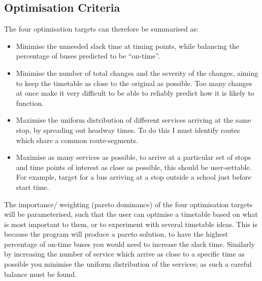 \documentclass{article}
\begin{document}
\subsection{Optimisation Criteria}
The four optimisation targets can therefore be summarised as:
\begin{itemize}
	\item Minimise the unneeded slack time at timing points, while balancing the percentage of buses predicted to be ``on-time''.
	\item Minimise the number of total changes and the severity of the changes, aiming to keep the timetable as close to the original as possible. Too many changes at once make it very difficult to be able to reliably predict how it is likely to function. 
	\item Maximise the uniform distribution of different services arriving at the same stop, by spreading out headway times. To do this I must identify routes which share a common route-segments.
	\item Maximise as many services as possible, to arrive at a particular set of stops and time points of interest as close as possible, this should be user-settable. For example, target for a bus arriving at a stop outside a school just before start time.
\end{itemize}
 
 The importance/ weighting (pareto dominance) of the four optimisation targets will be parameterised, such that the user can optimise a timetable based on what is most important to them, or to experiment with several timetable ideas. This is because the program will produce a pareto solution, to have the highest percentage of on-time buses you would need to increase the slack time. Similarly by increasing the number of service which arrive as close to a specific time as possible you minimise the uniform distribution of the services; as such a careful balance must be found.
\end{document}
